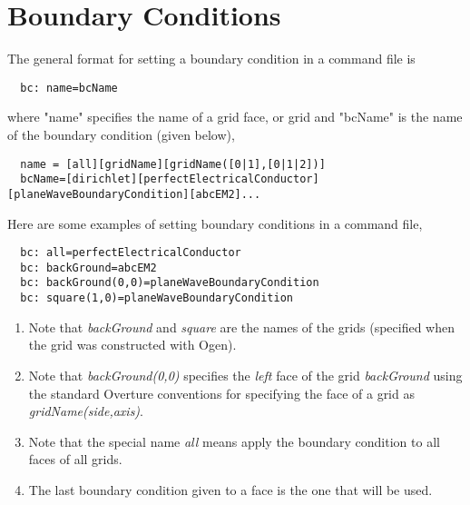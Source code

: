 \documentclass{article}
\begin{document}
\clearpage
\section{Boundary Conditions} \label{sec:bc}

The general format for setting a boundary condition in a command file is
\begin{verbatim}
  bc: name=bcName
\end{verbatim}
where "name" specifies the name of a grid face, or grid and "bcName" is the name of the boundary
condition (given below), 
\begin{verbatim}
  name = [all][gridName][gridName([0|1],[0|1|2])]
  bcName=[dirichlet][perfectElectricalConductor][planeWaveBoundaryCondition][abcEM2]...
\end{verbatim}
Here are some examples of setting boundary conditions in a command file,
\begin{verbatim}
  bc: all=perfectElectricalConductor
  bc: backGround=abcEM2
  bc: backGround(0,0)=planeWaveBoundaryCondition
  bc: square(1,0)=planeWaveBoundaryCondition
\end{verbatim}
\begin{enumerate}
  \item Note that {\em backGround} and {\em square} are the names of the grids (specified when the grid was constructed with Ogen).
  \item Note that {\em backGround(0,0)} specifies the {\em left} face of the  grid {\em backGround} using the standard Overture conventions for
   specifying the face of a grid as {\em gridName(side,axis)}.
  \item Note that the special name {\em all} means apply the boundary condition to all faces of all grids.
  \item The last boundary condition given to a face is the one that will be used. 
\end{enumerate}
\end{document}
